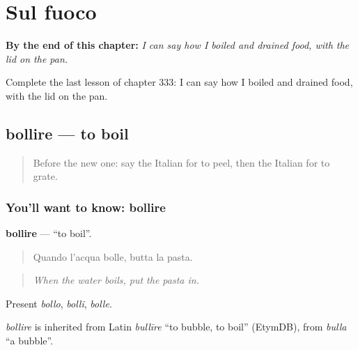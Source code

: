 
\chapter{Sul fuoco}
\label{ch:it-sul-fuoco}

\begin{chapteropening}
\textbf{By the end of this chapter:} \emph{I can say how I boiled and drained food, with the lid on the pan.}

Complete the last lesson of chapter 333: I can say how I boiled and drained food, with the lid on the pan.
\end{chapteropening}

\section[bollire]{bollire — to boil}

\label{lesson:IT-C333-bollire}



\begin{quote}
Before the new one: say the Italian for to peel, then the Italian for to grate.
\end{quote}

\subsection*{You'll want to know: bollire}
\textbf{bollire} — \textquotedblleft{}to boil\textquotedblright{}.

\begin{quote}
Quando l'acqua bolle, butta la pasta.
\end{quote}

\begin{quote}
\emph{When the water boils, put the pasta in.}
\end{quote}

Present \emph{bollo}, \emph{bolli}, \emph{bolle}.

\begin{cousinweb}
\emph{bollire} is inherited from Latin \emph{bullīre} \textquotedblleft{}to bubble, to boil\textquotedblright{} (EtymDB), from \emph{bulla} \textquotedblleft{}a bubble\textquotedblright{}.
\end{cousinweb}

